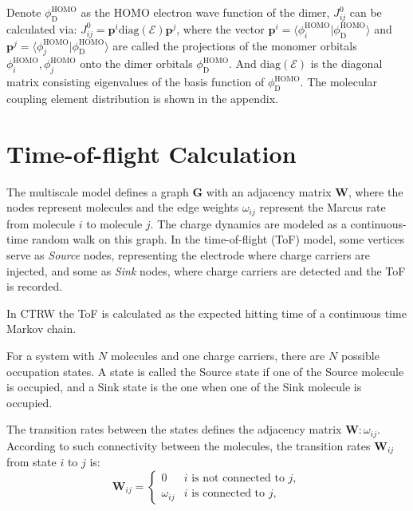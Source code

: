 \documentclass[letterpaper,12pt]{article}
\begin{document}
Denote $\phi^\text{HOMO}_\text{D}$ as the HOMO electron wave function of the dimer,  $J^0_{ij}$ can be calculated via:
$
    J^0_{ij} = \mathbf{p}^i \text{diag}(\mathcal{E}) \mathbf{p}^j
$, 
where the vector $\mathbf{p}^i = \langle \phi_i^\text{HOMO} | \phi^\text{HOMO}_\text{D} \rangle$ and $\mathbf{p}^j = \langle \phi_j^\text{HOMO} | \phi_\text{D}^\text{HOMO} \rangle$ are called the projections of the monomer orbitals $\phi_i^\text{HOMO}, \phi_j^\text{HOMO}$ onto the dimer orbitals $\phi^\text{HOMO}_\text{D}$. And $\text{diag}(\mathcal{E})$ is the diagonal matrix consisting eigenvalues of the basis function of $\phi_\text{D}^\text{HOMO}$. The molecular coupling element distribution is shown in the appendix.


\section{Time-of-flight Calculation}
The multiscale model defines a graph $\mathbf{G}$ with an adjacency matrix $\mathbf{W}$, where the nodes represent molecules and the edge weights $\omega_{ij}$ represent the Marcus rate from molecule $i$ to molecule $j$. 
The charge dynamics are modeled as a continuous-time random walk on this graph. In the time-of-flight (ToF) model, some vertices serve as \textit{Source} nodes, representing the electrode where charge carriers are injected, and some as \textit{Sink} nodes, where charge carriers are detected and the ToF is recorded.

In CTRW the ToF is calculated as the expected hitting time of a continuous time Markov chain.

For a system with $N$ molecules and one charge carriers, there are $N$ possible occupation states. A state is called the Source state if one of the Source molecule is occupied, and a Sink state is the one when one of the Sink molecule is occupied.

The transition rates between the states defines the adjacency matrix $\mathbf{W}:\omega_{ij}$.
According to such connectivity between the molecules, the transition rates $\mathbf{W}_{ij}$ from state $i$ to $j$ is:
\begin{equation}\label{eq:transition_rates}
	\mathbf{W}_{ij} =
	\begin{cases}
	     0			&  i \text{ is not connected to } j,\\
         \omega_{ij}   &  i \text{ is connected to } j,
	\end{cases}
\end{equation}
\end{document}
